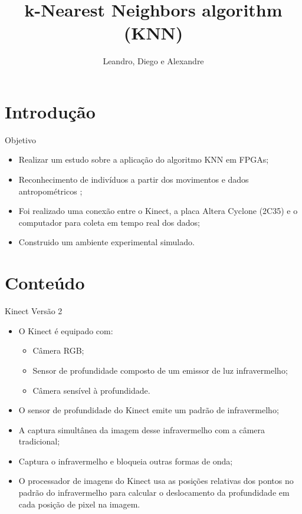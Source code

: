 \documentclass[11pt]{beamer}
\author{Leandro, Diego e Alexandre}
\title{k-Nearest Neighbors algorithm (KNN)}
\begin{document}
\begin{frame}
\titlepage
\end{frame}

\begin{frame}
\tableofcontents
\end{frame}

\section{Introdução}
\begin{frame}{Objetivo}

\begin{itemize}
	\item Realizar um estudo sobre a aplicação do algoritmo KNN em FPGAs;
	\item Reconhecimento de indivíduos a partir dos movimentos e dados antropométricos \cite{granaidentificaccao};
	\item Foi realizado uma conexão entre o Kinect, a placa Altera Cyclone (2C35) e o computador para coleta em tempo real dos dados;
	\item Construido um ambiente experimental simulado. 
\end{itemize}

\end{frame}

\section{Conteúdo}
\begin{frame}{Kinect Versão 2}

\begin{itemize}
	\item O Kinect é equipado com:
	\begin{itemize}
		\item Câmera RGB;
		\item Sensor de profundidade composto de um emissor de luz infravermelho;
		\item Câmera sensível à profundidade. 
	\end{itemize}
	\item O sensor de profundidade do Kinect emite um padrão de infravermelho;
	\item A captura simultânea da imagem desse infravermelho com a câmera tradicional;
	\item Captura o infravermelho e bloqueia outras formas de onda;
	\item O processador de imagens do Kinect usa as posições relativas dos pontos no padrão do infravermelho para calcular o deslocamento da profundidade em cada posição de pixel na imagem.
\end{itemize}

\end{frame}
\end{document}
